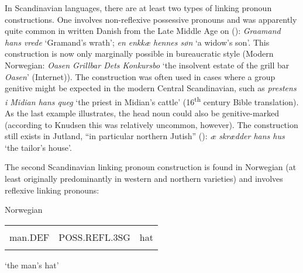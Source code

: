 \begin{styleBodytextC}
In Scandinavian languages, there are at least two types of linking pronoun constructions. One involves non-reflexive possessive pronouns and was apparently quite common in written Danish from the Late Middle Age on (\citet[61]{Knudsen1941}): \textit{Graamand hans vrede }‘Gramand’s wrath’; \textit{en enkkæ hennes søn} ‘a widow’s son’. This construction is now only marginally possible in bureaucratic style (Modern Norwegian: \textit{Oasen Grillbar Dets Konkursbo} ‘the insolvent estate of the grill bar \textit{Oasen}’ (Internet)). The construction was often used in cases where a group genitive might be expected in the modern Central Scandinavian, such as \textit{prestens i Midian hans queg} ‘the priest in Midian’s cattle’ (16\textsuperscript{th} century Bible translation). As the last example illustrates, the head noun could also be genitive-marked (according to Knudsen this was relatively uncommon, however). The construction still exists in Jutland, “in particular northern Jutish” (\citet[62]{Knudsen1941}): \textit{æ skrædder hans hus} ‘the tailor’s house’.

\end{styleBodytextC}

\begin{styleBodytextC}
The second Scandinavian linking pronoun construction is found in Norwegian (at least originally predominantly in western and northern varieties) and involves reflexive linking pronouns:

\end{styleBodytextC}

\begin{listWWNumileveli}
\item {}

\begin{styleExample}
Norwegian

\end{styleExample}

\end{listWWNumileveli}

\begin{tabular}{lll}
\lsptoprule
\multicolumn{3}{l}{mannen

}\\
man.DEF & POSS.REFL.3SG & hat\\
\lspbottomrule
\end{tabular}

\begin{styleTranslation}
‘the man’s hat’

\end{styleTranslation}

